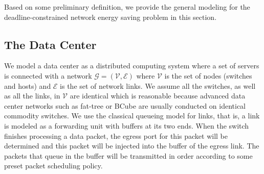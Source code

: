 \documentclass[10pt, conference, compsocconf]{IEEEtran}
\begin{document}
Based on some preliminary definition, we provide the general modeling for the deadline-constrained network energy saving problem in this section. 

\subsection{The Data Center}

We model a data center as a distributed computing system where a set of servers is connected with a network $\mathcal{G}=(\mathcal{V},\mathcal{E})$ where $\mathcal{V}$ is the set of nodes (switches and hosts) and $\mathcal{E}$ is the set of network links. We assume all the switches, as well as all the links, in $\mathcal{V}$ are identical which is reasonable because advanced data center networks such as fat-tree \cite{Al-Fares_Loukissas-FatTree-2008} or BCube \cite{Guo_Lu-BCube-2009} are usually conducted on identical commodity switches. We use the classical queueing model for links, that is, a link is modeled as a forwarding unit with buffers at its two ends. When the switch finishes processing a data packet, the egress port for this packet will be determined and this packet will be injected into the buffer of the egress link. The packets that queue in the buffer will be transmitted in order according to some preset packet scheduling policy.
\end{document}
